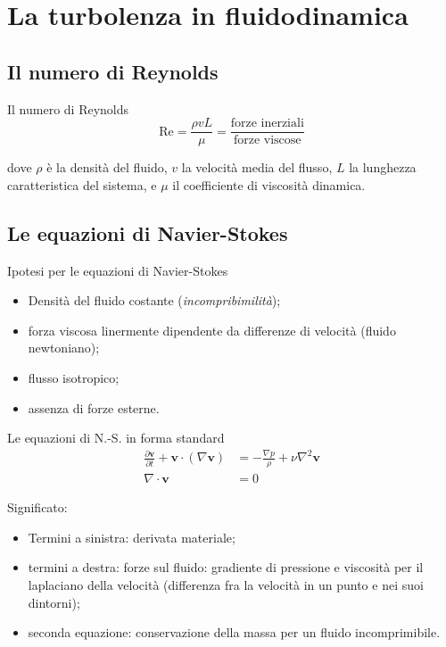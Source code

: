 \documentclass[11pt]{beamer}
\begin{document}
\section{La turbolenza in fluidodinamica}

\subsection{Il numero di Reynolds}

\begin{frame}{Il numero di Reynolds}
\begin{equation}
\text{Re} = \frac{\rho v L}{\mu} = \frac{\text{forze inerziali}}{\text{forze viscose}}
\end{equation}

dove $\rho$ è la densità del fluido, $v$ la velocità media del flusso, $L$ la lunghezza caratteristica del sistema, e $\mu$ il coefficiente di viscosità dinamica.
\end{frame}

\subsection{Le equazioni di Navier-Stokes}

\begin{frame}{Ipotesi per le equazioni di Navier-Stokes}
\begin{itemize}
\item Densità del fluido costante (\emph{incompribimilità});
\item forza viscosa linermente dipendente da differenze di velocità (fluido newtoniano);
\item flusso isotropico;
\item assenza di forze esterne.
\end{itemize}
\end{frame}

\begin{frame}{Le equazioni di N.-S. in forma standard}
\begin{subequations}
\begin{align}
\frac{\partial \mathbf{v}}{\partial t} + \mathbf{v} \cdot (\nabla \mathbf{v})  &= -\frac{\nabla p}{\rho} + \nu \nabla^2 \mathbf{v} \label{navier-stokes} \\
\nabla \cdot \mathbf{v} &= 0
\end{align}
\end{subequations}

Significato:

\begin{itemize}
\item Termini a sinistra: derivata materiale;
\item termini a destra: forze sul fluido: gradiente di pressione e viscosità per il laplaciano della velocità (differenza fra la velocità in un punto e nei suoi dintorni);
\item seconda equazione: conservazione della massa per un fluido incomprimibile.
\end{itemize}
\end{frame}
\end{document}

